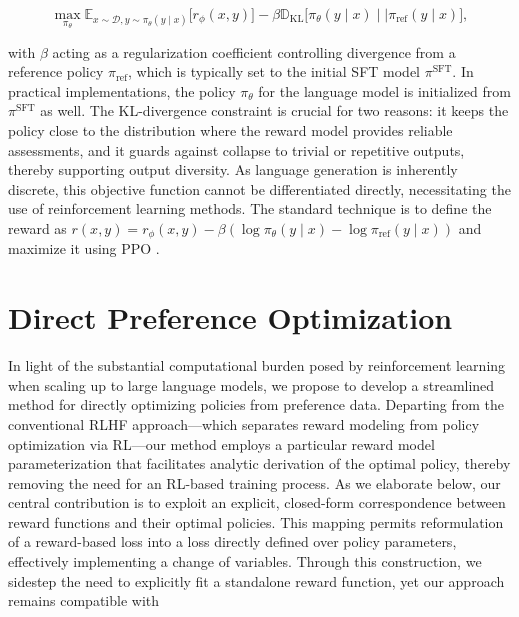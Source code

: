 \begin{equation}\label{eq:RL}
\max_{\pi_{\theta}}  \mathbb{E}_{x\sim \mathcal{D}, y\sim \pi_{\theta}(y \mid x)}\bigl[r_{\phi}(x, y)\bigr] - \beta\mathbb{D}_{\textrm{KL}}\bigl[\pi_{\theta}(y\mid x)\mid \mid \pi_\text{ref}(y\mid x)\bigr],
\end{equation}

with $\beta$ acting as a regularization coefficient controlling divergence from a reference policy $\pi_\text{ref}$, which is typically set to the initial SFT model $\pi^\text{SFT}$. In practical implementations, the policy $\pi_\theta$ for the language model is initialized from $\pi^\text{SFT}$ as well. The KL-divergence constraint is crucial for two reasons: it keeps the policy close to the distribution where the reward model provides reliable assessments, and it guards against collapse to trivial or repetitive outputs, thereby supporting output diversity. As language generation is inherently discrete, this objective function cannot be differentiated directly, necessitating the use of reinforcement learning methods. The standard technique \citep{ziegler2020finetuning, stiennon2022learning, bai2022training, ouyang2022training} is to define the reward as ${r(x, y) = r_{\phi}(x, y) -\beta (\log \pi_{\theta}(y\mid x) - \log \pi_\text{ref}(y\mid x))}$ and maximize it using PPO \cite{schulman2017proximal}.

\section{Direct Preference Optimization}\label{sec:DPO}

In light of the substantial computational burden posed by reinforcement learning when scaling up to large language models, we propose to develop a streamlined method for directly optimizing policies from preference data. Departing from the conventional RLHF approach—which separates reward modeling from policy optimization via RL—our method employs a particular reward model parameterization that facilitates analytic derivation of the optimal policy, thereby removing the need for an RL-based training process. As we elaborate below, our central contribution is to exploit an explicit, closed-form correspondence between reward functions and their optimal policies. This mapping permits reformulation of a reward-based loss into a loss directly defined over policy parameters, effectively implementing a change of variables. Through this construction, we sidestep the need to explicitly fit a standalone reward function, yet our approach remains compatible with

